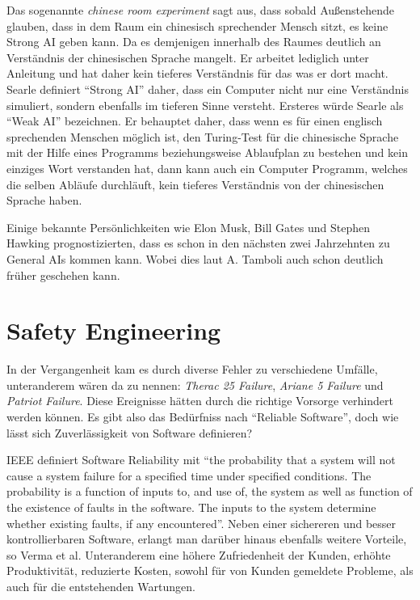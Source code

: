             Das sogenannte \textit{chinese room experiment} sagt aus, dass sobald Außenstehende glauben,
            dass in dem Raum ein chinesisch sprechender Mensch sitzt, es keine Strong AI geben kann. Da es demjenigen
            innerhalb des Raumes deutlich an Verständnis der chinesischen Sprache mangelt. Er arbeitet lediglich unter
            Anleitung und hat daher kein tieferes Verständnis für das was er dort macht. Searle definiert
            ``Strong AI'' daher, dass ein Computer nicht nur eine Verständnis simuliert, sondern ebenfalls im tieferen
            Sinne versteht. Ersteres würde Searle als ``Weak AI'' bezeichnen. \cite{cole_2014} Er behauptet daher, dass
            wenn es für einen englisch sprechenden Menschen möglich ist, den Turing-Test für die chinesische Sprache mit
            der Hilfe eines Programms beziehungsweise Ablaufplan zu bestehen und kein einziges Wort verstanden hat, dann
            kann auch ein Computer Programm, welches die selben Abläufe durchläuft, kein tieferes Verständnis von der
            chinesischen Sprache haben.\cite{cole_2014}

            Einige bekannte Persönlichkeiten wie Elon Musk, Bill Gates und Stephen Hawking prognostizierten, dass es
            schon in den nächsten zwei Jahrzehnten zu General AIs kommen kann. \cite[p. 20]{Tamboli2019} Wobei dies laut
            A. Tamboli auch schon deutlich früher geschehen kann.

    \section{Safety Engineering}
        In der Vergangenheit kam es durch diverse Fehler zu verschiedene Umfälle, unteranderem wären da zu nennen:
        \textit{Therac 25 Failure}, \textit{Ariane 5 Failure} und \textit{Patriot Failure}. Diese Ereignisse hätten
        durch die richtige Vorsorge verhindert werden können.\cite[p. 185]{Verma2015} Es gibt also das Bedürfniss
        nach ``Reliable Software'', doch wie lässt sich Zuverlässigkeit von Software definieren?

        IEEE definiert Software Reliability mit ``the probability that a system will not cause a system failure
        for a specified time under specified conditions. The probability is a function of inputs to, and use of,
        the system as well as function of the existence of faults in the software. The inputs to the system
        determine whether existing faults, if any encountered''.\cite[p. 183]{Verma2015} Neben einer sichereren und
        besser kontrollierbaren Software, erlangt man darüber hinaus ebenfalls weitere Vorteile, so Verma et al.
        Unteranderem eine höhere Zufriedenheit der Kunden, erhöhte Produktivität, reduzierte Kosten, sowohl für
        von Kunden gemeldete Probleme, als auch für die entstehenden Wartungen.

